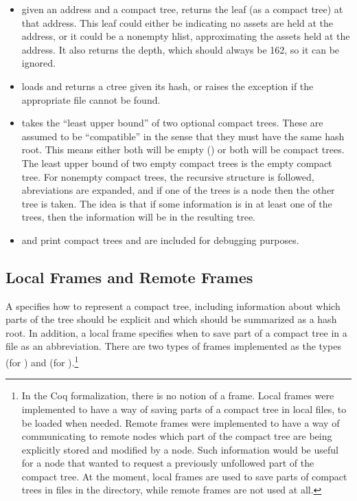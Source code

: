 \begin{itemize}
\item {} given an address and a compact tree,
returns the leaf (as a compact tree) at that address.
This leaf could either be {} indicating no assets are held at the address,
or it could be a nonempty hlist, approximating the assets held at the address.
It also returns the depth, which should always be 162, so it can be ignored.
\item {} loads and returns a ctree given its hash, or
raises the {} exception if the appropriate file cannot be found.
\item {} takes the ``least upper bound'' of two optional compact trees.
These are assumed to be ``compatible'' in the sense that they must have the same hash root.
This means either both will be empty ({})
or both will be compact trees.
The least upper bound of two empty compact trees is the empty compact tree.
For nonempty compact trees, the recursive structure is followed,
abreviations are expanded, and if one of the trees is a {}
node then the other tree is taken.
The idea is that if some information is in at least one of the trees,
then the information will be in the resulting tree.
\item {} and {} print compact trees and are included for debugging purposes.
\end{itemize}

\subsection{Local Frames and Remote Frames}

A {} specifies how to represent a compact tree,
including information about which parts of the tree should
be explicit and which should be summarized as a hash root.
In addition, a local frame specifies when to save
part of a compact tree in a file as an abbreviation.
There are two types of frames implemented as the types
{} (for {}) and {} (for
{}).\footnote{In the Coq formalization, there is
no notion of a frame. Local frames were implemented to have a way of
saving parts of a compact tree in local files, to be loaded when
needed. Remote frames were implemented to have a way of communicating
to remote nodes which part of the compact tree are being explicitly
stored and modified by a node. Such information would be useful for a
node that wanted to request a previously unfollowed part of the
compact tree. At the moment, local frames are used to save parts of
compact trees in files in the {} directory, while remote
frames are not used at all.}

